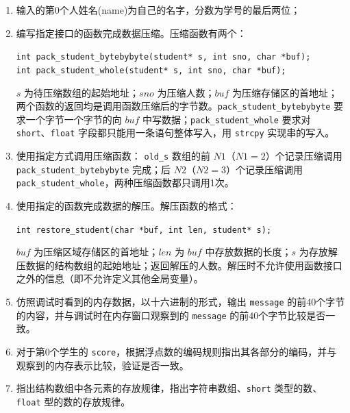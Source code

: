 \documentclass[supercite]{Experimental_Report}
\theoremstyle{definition}
\begin{document}
	\begin{enumerate}
		\item 输入的第0个人姓名(name)为自己的名字，分数为学号的最后两位；
		
		\item 编写指定接口的函数完成数据压缩。压缩函数有两个：
		
		\noindent \texttt{int  pack\_student\_bytebybyte(student* s, int sno, char *buf);} \\
		\texttt{int  pack\_student\_whole(student* s, int sno, char *buf);}
		
		$s$ 为待压缩数组的起始地址；$sno$ 为压缩人数；$buf$ 为压缩存储区的首地址；两个函数的返回均是调用函数压缩后的字节数。\texttt{pack\_student\_bytebybyte} 要求一个字节一个字节的向 $buf$ 中写数据；\texttt{pack\_student\_whole} 要求对 \texttt{short}、\texttt{float} 字段都只能用一条语句整体写入，用 \texttt{strcpy} 实现串的写入。
		
		\item 使用指定方式调用压缩函数：
		\texttt{old\_s} 数组的前 $N1$（$N1=2$）个记录压缩调用 \texttt{pack\_student\_bytebybyte} 完成；后 $N2$（$N2=3$）个记录压缩调用 \texttt{pack\_student\_whole}，两种压缩函数都只调用1次。
		
		\item 使用指定的函数完成数据的解压。解压函数的格式：
		
		\noindent \texttt{int restore\_student(char *buf, int len, student* s);}
		
		$buf$ 为压缩区域存储区的首地址；$len$ 为 $buf$ 中存放数据的长度；$s$ 为存放解压数据的结构数组的起始地址；返回解压的人数。解压时不允许使用函数接口之外的信息（即不允许定义其他全局变量）。
		
		\item 仿照调试时看到的内存数据，以十六进制的形式，输出 \texttt{message} 的前40个字节的内容，并与调试时在内存窗口观察到的 \texttt{message} 的前40个字节比较是否一致。
		
		\item 对于第0个学生的 \texttt{score}，根据浮点数的编码规则指出其各部分的编码，并与观察到的内存表示比较，验证是否一致。
		
		\item 指出结构数组中各元素的存放规律，指出字符串数组、\texttt{short} 类型的数、\texttt{float} 型的数的存放规律。
	\end{enumerate}
	
\end{document}
